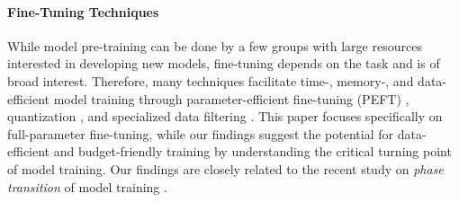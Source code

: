 \paragraph{Fine-Tuning Techniques}
While model pre-training can be done by a few groups with large resources interested in developing new models, fine-tuning depends on the task and is of broad interest. Therefore, many techniques facilitate time-, memory-, and data-efficient model training through parameter-efficient fine-tuning (PEFT) \cite{hu2021lora, liu2021p, liu2023gpt}, quantization \cite{jacob2018quantization, dettmers2022gpt3, dettmers2024qlora}, and specialized data filtering \cite{xia2024less, zhou2024lima, attendu-corbeil-2023-nlu}.
This paper focuses specifically on full-parameter fine-tuning, while our findings suggest the potential for data-efficient and budget-friendly training by understanding the critical turning point of model training.
Our findings are closely related to the recent study on \textit{phase transition} of model training \cite{olsson2022context, wei2022emergent, chen2023sudden}.






